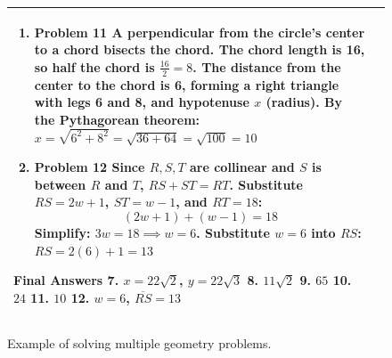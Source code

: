 \begin{figure}[h]
\begin{tabular}{m{3cm}m{12cm}}
{\begin{enumerate}
\item Problem 11  
A perpendicular from the circle’s center to a chord bisects the chord. The chord length is 16, so half the chord is \( \frac{16}{2} = 8 \). The distance from the center to the chord is 6, forming a right triangle with legs 6 and 8, and hypotenuse \( x \) (radius). By the Pythagorean theorem:  
\( x = \sqrt{6^2 + 8^2} = \sqrt{36 + 64} = \sqrt{100} = 10 \)   

\item Problem 12  
Since \( R, S, T \) are collinear and \( S \) is between \( R \) and \( T \), \( RS + ST = RT \). Substitute \( RS = 2w + 1 \), \( ST = w - 1 \), and \( RT = 18 \):  
\[ (2w + 1) + (w - 1) = 18 \]  
Simplify: \( 3w = 18 \implies w = 6 \).  
Substitute \( w = 6 \) into \( RS \):  
\( RS = 2(6) + 1 = 13 \) 
\end{enumerate}

\textbf{Final Answers}
7. \( x = 22\sqrt{2} \), \( y = 22\sqrt{3} \)  
8. \( 11\sqrt{2} \)  
9. \( 65 \)  
10. \( 24 \)  
11. \( 10 \)  
12. \( w = 6 \), \( \overline{RS} = 13 \)
} \\
  \bottomrule
  \end{tabular}
\caption{Example of \mimovlrl{} solving multiple geometry problems.}
\label{fig:case4}
\end{figure}
\renewcommand{\arraystretch}{1}

\clearpage
